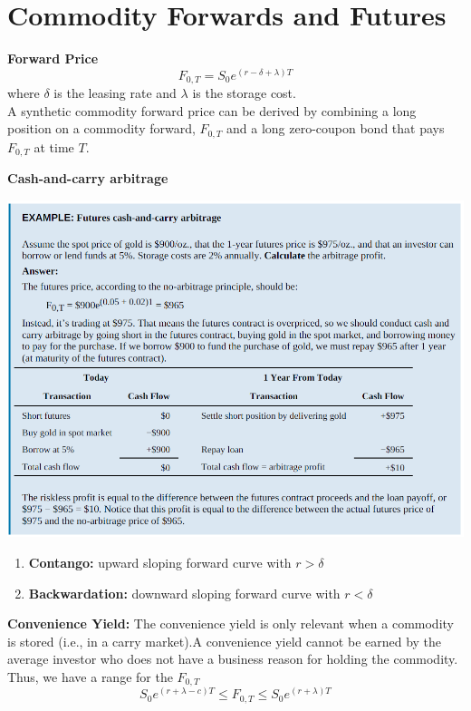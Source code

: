 \documentclass[11pt,fleqn]{book} %
\numberwithin{equation}{section} %
\numberwithin{figure}{section} %
\numberwithin{table}{section} %
\begin{document}
\chapter{Commodity Forwards and Futures}
 \begin{theorem}\textbf{Forward Price}
 $$
 F_{0,T}=S_0e^{(r-\delta+\lambda)T}
 $$
 where $\delta$ is the leasing rate and $\lambda$ is the storage cost.\\
 A synthetic commodity forward price can be derived by combining a long position on a commodity forward, $F_{0,T}$ and a long zero-coupon bond that pays $F_{0,T}$ at time $T$.
 \end{theorem}
 \begin{exercise}\textbf{Cash-and-carry arbitrage}
 \begin{center}
     \includegraphics[scale=0.42]{commfor.PNG}
 \end{center}
 \end{exercise}
  \begin{definition}
 \begin{enumerate}
     \item \textbf{Contango:} upward sloping forward curve with $r>\delta$
     \item \textbf{Backwardation:} downward sloping forward curve with $r<\delta$
 \end{enumerate}
 \end{definition}
 \begin{definition}\textbf{Convenience Yield:} The convenience yield is only relevant when a commodity is stored (i.e., in a carry market).A convenience yield cannot be earned by the average investor who does not have a business reason for holding the commodity. Thus, we have a range for the $F_{0,T}$
 $$
 S_{0}e^{(r+\lambda-c)T}\leq F_{0,T}\leq S_{0}e^{(r+\lambda)T}
 $$
 \end{definition}
\end{document}
